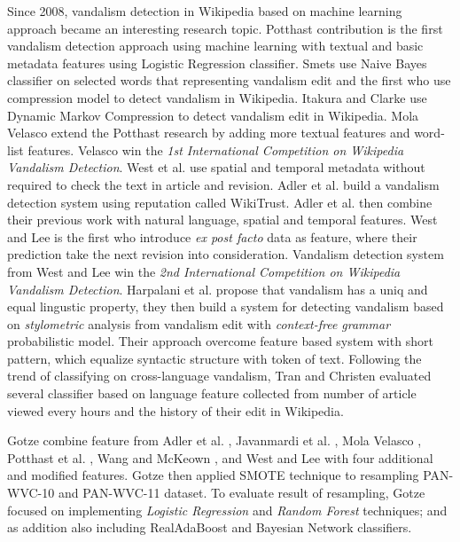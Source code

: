 \documentclass[conference,compsoc,a4paper,twocolumn,final]{IEEEtran}
\begin{document}
Since 2008, vandalism detection in Wikipedia based on machine learning approach
became an interesting research topic.
Potthast \cite{potthast2008automatic} contribution is the first vandalism
detection approach using machine learning with textual and basic
metadata features using Logistic Regression classifier.
Smets \cite{smets08automaticvandalism} use Naive Bayes classifier on selected
words that representing vandalism edit and the first who use compression model
to detect vandalism in Wikipedia.
Itakura and Clarke \cite{itakura2009using} use Dynamic Markov Compression to
detect vandalism edit in Wikipedia.
Mola Velasco \cite{mola2012wikipedia} extend the Potthast research by adding
more textual features and word-list features.
Velasco win the \textit{1st International Competition on Wikipedia Vandalism
Detection}.
West et al. \cite{west2011multilingual} use spatial and temporal metadata
without required to check the text in article and revision.
Adler et al. \cite{adler2011wikipedia} build a vandalism detection system using
reputation called WikiTrust.
Adler et al. \cite{adler2011wikipedia} then combine their previous work with
natural language, spatial and temporal features.
West and Lee \cite{west2011multilingual} is the first who introduce
\textit{ex post facto} data as feature, where their prediction take the next
revision into consideration.
Vandalism detection system from West and Lee win the \textit{2nd International
Competition on Wikipedia Vandalism Detection}.
Harpalani et al. \cite{harpalani2011language} propose that vandalism has
a uniq and equal lingustic property, they then build a system for detecting
vandalism based on \textit{stylometric} analysis from vandalism edit with
\textit{context-free grammar} probabilistic model.
Their approach overcome feature based system with short pattern, which equalize
syntactic structure with token of text.
Following the trend of classifying on cross-language vandalism, Tran and
Christen \cite{tran2013cross} evaluated several classifier based on
language feature collected from number of article viewed every hours and the
history of their edit in Wikipedia.

Gotze \cite{gotze2014advanced} combine feature from
Adler et al. \cite{adler2011wikipedia},
Javanmardi et al. \cite{javanmardi2011vandalism},
Mola Velasco \cite{mola2012wikipedia},
Potthast et al. \cite{potthast2008automatic},
Wang and McKeown \cite{wang2010got}, and
West and Lee \cite{west2011multilingual}
with four additional and modified features.
Gotze then applied SMOTE technique to resampling PAN-WVC-10 and PAN-WVC-11
dataset.
To evaluate result of resampling, Gotze focused on implementing
\textit{Logistic Regression} and \textit{Random Forest} techniques;
and as addition also including RealAdaBoost and Bayesian Network classifiers.
\end{document}
